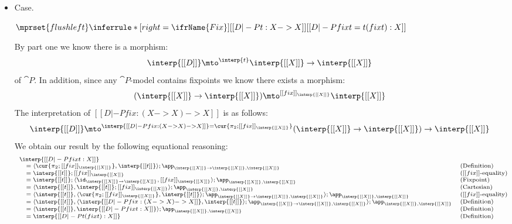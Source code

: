 \begin{itemize}
\item[] Case.\ \\ 
  \begin{center}
    \begin{math}
      $$\mprset{flushleft}
      \inferrule* [right=\ifrName{Fix}] {
        [[D |-P t : X -> X]]
      }{[[D |-P fix t = t (fix t) : X]]}
    \end{math}
  \end{center}
  By part one we know there is a morphism:
  \[ \interp{[[D]]} \mto^{\interp{t}} \interp{[[X]]} \to \interp{[[X]]} \]
  of $\cat{P}$.  In addition, since any $\cat{P}$-model contains
  fixpoints we know there exists a morphism:
  \[
  (\interp{[[X]]} \to \interp{[[X]]}) \mto^{[[fix]]_{\interp{[[X]]}}} \interp{[[X]]}
  \]
  The interpretation of $[[D |-P fix : (X -> X) -> X]]$ is as follows:
  \[
  \interp{[[D]]} \mto^{\interp{[[D |-P fix : (X -> X) -> X]]} = \cur{\pi_2;[[fix]]_{\interp{[[X]]}}}} (\interp{[[X]]} \to \interp{[[X]]}) \to \interp{[[X]]}
  \]
  We obtain our result by the following equational reasoning:
  \[
  \scriptsize
  \begin{array}{lllll}
    \interp{[[D |-P fix t : X]]}\\
    \,\,\,\,\,\,= \langle \cur{\pi_2;[[fix]]_{\interp{[[X]]}}}, \interp{[[t]]} \rangle;\app_{\interp{[[X]]} \to \interp{[[X]]},\interp{[[X]]}}   & \text{(Definition)}\\
    \,\,\,\,\,\,= \interp{[[t]]};[[fix]]_{\interp{[[X]]}} & \text{($[[fix]]$-equality)}\\
    \,\,\,\,\,\,= \interp{[[t]]};\langle \id_{\interp{[[X]]} \to \interp{[[X]]}}, [[fix]]_{\interp{[[X]]}} \rangle;\app_{\interp{[[X]]},\interp{[[X]]}} & \text{(Fixpoint)}\\
    \,\,\,\,\,\,= \langle \interp{[[t]]}, \interp{[[t]]};[[fix]]_{\interp{[[X]]}} \rangle;\app_{\interp{[[X]]},\interp{[[X]]}} & \text{(Cartesian)}\\
    \,\,\,\,\,\,= \langle \interp{[[t]]}, \langle \cur{\pi_2;[[fix]]_{\interp{[[X]]}}},\interp{[[t]]} \rangle;\app_{\interp{[[X]]} \to \interp{[[X]]},\interp{[[X]]}} \rangle;\app_{\interp{[[X]]},\interp{[[X]]}} & \text{($[[fix]]$-equality)}\\
    \,\,\,\,\,\,= \langle \interp{[[t]]}, \langle \interp{[[D |-P fix : (X -> X) -> X]]},\interp{[[t]]} \rangle;\app_{\interp{[[X]]} \to \interp{[[X]]},\interp{[[X]]}} \rangle;\app_{\interp{[[X]]},\interp{[[X]]}} & \text{(Definition)}\\
    \,\,\,\,\,\,= \langle \interp{[[t]]}, \interp{[[D |-P fix t : X]]} \rangle;\app_{\interp{[[X]]},\interp{[[X]]}} & \text{(Definition)}\\
    \,\,\,\,\,\,= \interp{[[D |-P t (fix t) : X]]} & \text{(Definition)}\\      
  \end{array}
  \]


\end{itemize}
